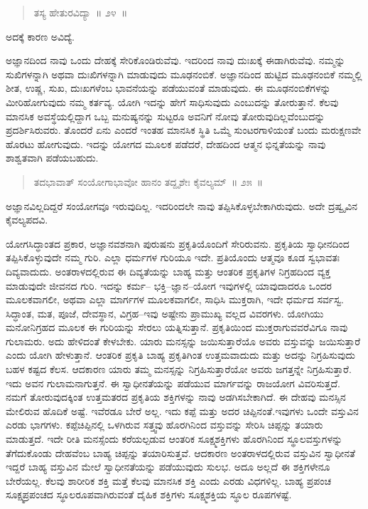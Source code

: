 \vspace{-0.3cm}

\begin{verse}
ತಸ್ಯ ಹೇತುರವಿದ್ಯಾ~॥ ೨೪~॥
\end{verse}

\vspace{-0.3cm}

ಅದಕ್ಕೆ ಕಾರಣ ಅವಿದ್ಯೆ. 

ಅಜ್ಞಾನದಿಂದ ನಾವು ಒಂದು ದೇಹಕ್ಕೆ ಸೇರಿಕೊಂಡಿರುವೆವು. ಇದರಿಂದ ನಾವು ದುಃಖಕ್ಕೆ ಈಡಾಗಿರುವೆವು. ನಮ್ಮನ್ನು ಸುಖಿಗಳನ್ನಾಗಿ ಅಥವಾ ದುಃಖಿಗಳನ್ನಾಗಿ ಮಾಡುವುದು ಮೂಢನಂಬಿಕೆ. ಅಜ್ಞಾನದಿಂದ ಹುಟ್ಟಿದ ಮೂಢನಂಬಿಕೆ ನಮ್ಮಲ್ಲಿ ಶೀತ, ಉಷ್ಣ, ಸುಖ, ದುಃಖಗಳೆಂಬ ಭಾವನೆಯನ್ನು ಪಡೆಯುವಂತೆ ಮಾಡುವುದು. ಈ ಮೂಢನಂಬಿಕೆಗಳನ್ನು ಮೀರಿಹೋಗುವುದು ನಮ್ಮ ಕರ್ತವ್ಯ. ಯೋಗಿ ಇದನ್ನು ಹೇಗೆ ಸಾಧಿಸುವುದು ಎಂಬುದನ್ನು ತೋರುತ್ತಾನೆ. ಕೆಲವು ಮಾನಸಿಕ ಅವಸ್ಥೆಯಲ್ಲಿದ್ದಾಗ ಒಬ್ಬ ಮನುಷ್ಯನನ್ನು ಸುಟ್ಟರೂ ಅವನಿಗೆ ನೋವು ತೋರುವುದಿಲ್ಲವೆಂಬುದನ್ನು ಪ್ರದರ್ಶಿಸಿರುವರು. ತೊಂದರೆ ಏನು ಎಂದರೆ ಇಂತಹ ಮಾನಸಿಕ ಸ್ಥಿತಿ ಒಮ್ಮೆ ಸುಂಟರಗಾಳಿಯಂತೆ ಬಂದು ಮರುಕ್ಷಣವೇ ಹೊರಟು ಹೋಗುವುದು. ಇದನ್ನು ಯೋಗದ ಮೂಲಕ ಪಡೆದರೆ, ದೇಹದಿಂದ ಆತ್ಮನ ಭಿನ್ನತೆಯನ್ನು ನಾವು ಶಾಶ್ವತವಾಗಿ ಪಡೆಯಬಹುದು. 

\vspace{-0.3cm}

\begin{verse}
ತದಭಾವಾತ್​ ಸಂಯೋಗಾಭಾವೋ ಹಾನಂ ತದ್ದೃಶೇಃ ಕೈವಲ್ಯಮ್​~॥ ೨೫~॥
\end{verse}

\vspace{-0.3cm}


ಅಜ್ಞಾನವಿಲ್ಲದಿದ್ದರೆ ಸಂಯೋಗವೂ ಇರುವುದಿಲ್ಲ. ಇದರಿಂದಲೇ ನಾವು ತಪ್ಪಿಸಿಕೊಳ್ಳಬೇಕಾಗಿರುವುದು. ಅದೇ ದ್ರಷ್ವೃವಿನ ಕೈವಲ್ಯಪದವಿ. 

ಯೋಗಸಿದ್ಧಾಂತದ ಪ್ರಕಾರ, ಅಜ್ಞಾನವಶನಾಗಿ ಪುರುಷನು ಪ್ರಕೃತಿಯೊಂದಿಗೆ ಸೇರಿರುವನು. ಪ್ರಕೃತಿಯ ಸ್ವಾಧೀನದಿಂದ ತಪ್ಪಿಸಿಕೊಳ್ಳುವುದೇ ನಮ್ಮ ಗುರಿ. ಎಲ್ಲಾ ಧರ್ಮಗಳ ಗುರಿಯೂ ಇದೇ. ಪ್ರತಿಯೊಂದು ಆತ್ಮವೂ ಕೂಡ ಸ್ವಭಾವತಃ ದಿವ್ಯವಾದುದು. ಅಂತರಾಳದಲ್ಲಿರುವ ಈ ದಿವ್ಯತೆಯನ್ನು ಬಾಹ್ಯ ಮತ್ತು ಆಂತರಿಕ ಪ್ರಕೃತಿಗಳ ನಿಗ್ರಹದಿಂದ ವ್ಯಕ್ತ ಮಾಡುವುದೇ ಜೀವನದ ಗುರಿ. ಇದನ್ನು ಕರ್ಮ– ಭಕ್ತಿ–ಜ್ಞಾನ–ಯೋಗ ಇವುಗಳಲ್ಲಿ ಯಾವುದಾದರೂ ಒಂದರ ಮೂಲಕವಾಗಲೀ, ಅಥವಾ ಎಲ್ಲಾ ಮಾರ್ಗಗಳ ಮೂಲಕವಾಗಲೀ, ಸಾಧಿಸಿ ಮುಕ್ತರಾಗಿ, ಇದೇ ಧರ್ಮದ ಸರ್ವಸ್ವ. ಸಿದ್ಧಾಂತ, ಮತ, ಪೂಜೆ, ದೇವಸ್ಥಾನ, ವಿಗ್ರಹ–ಇವು ಅಷ್ಟೇನು ಪ್ರಾಮುಖ್ಯ ವಲ್ಲದ ವಿವರಗಳು. ಯೋಗಿಯು ಮನೋನಿಗ್ರಹದ ಮೂಲಕ ಈ ಗುರಿಯನ್ನು ಸೇರಲು ಯತ್ನಿಸುತ್ತಾನೆ. ಪ್ರಕೃತಿಯಿಂದ ಮುಕ್ತರಾಗುವವರೆವಿಗೂ ನಾವು ಗುಲಾಮರು. ಅದು ಹೇಳಿದಂತೆ ಕೇಳಬೇಕು. ಯಾರು ಮನಸ್ಸನ್ನು ಜಯಿಸುತ್ತಾರೆಯೊ ಅವರು ವಸ್ತುವನ್ನು ಜಯಿಸುತ್ತಾರೆ ಎಂದು ಯೋಗಿ ಹೇಳುತ್ತಾನೆ. ಆಂತರಿಕ ಪ್ರಕೃತಿ ಬಾಹ್ಯ ಪ್ರಕೃತಿಗಿಂತ ಉತ್ತಮವಾದುದು ಮತ್ತು ಅದನ್ನು ನಿಗ್ರಹಿಸುವುದು ಬಹಳ ಕಷ್ಟದ ಕೆಲಸ. ಆದಕಾರಣ ಯಾರು ತಮ್ಮ ಮನಸ್ಸನ್ನು ನಿಗ್ರಹಿಸುತ್ತಾರೆಯೋ ಅವರು ಜಗತ್ತನ್ನೇ ನಿಗ್ರಹಿಸುತ್ತಾರೆ. ಇದು ಅವನ ಗುಲಾಮನಾಗುತ್ತನೆ. ಈ ಸ್ವಾಧೀನತೆಯನ್ನು ಪಡೆಯುವ ಮಾರ್ಗವನ್ನು ರಾಜಯೋಗ ವಿವರಿಸುತ್ತದೆ. ನಮಗೆ ತೋರುವುದಕ್ಕಿಂತ ಉತ್ತಮತರದ ಪ್ರಕೃತಿಯ ಶಕ್ತಿಗಳನ್ನು ನಾವು ಅಡಗಿಸಬೇಕಾಗಿದೆ. ಈ ದೇಹವು ಮನಸ್ಸಿನ ಮೇಲಿರುವ ಹೊದಿಕೆ ಅಷ್ಟೆ. ಇವೆರಡೂ ಬೇರೆ ಅಲ್ಲ. ಇದು ಕಪ್ಪೆ ಮತ್ತು ಅದರ ಚಿಪ್ಪಿನಂತೆ.\break ಇವುಗಳು ಒಂದೇ ವಸ್ತುವಿನ ಎರಡು ಭಾಗಗಳು. ಕಪ್ಪೆಚಿಪ್ಪಿನಲ್ಲಿ ಒಳಗಿರುವ ಸತ್ತ್ವವು ಹೊರಗಿನಿಂದ ವಸ್ತುವನ್ನು ಸೇರಿಸಿ ಚಿಪ್ಪನ್ನು ತಯಾರು ಮಾಡುತ್ತದೆ. ಇದೇ ರೀತಿ ಮನಸ್ಸೆಂದು ಕರೆಯಲ್ಪಡುವ ಆಂತರಿಕ ಸೂಕ್ಷ್ಮಶಕ್ತಿಗಳು ಹೊರಗಿನಿಂದ ಸ್ಥೂಲವಸ್ತುಗಳನ್ನು ತೆಗೆದುಕೊಂಡು ದೇಹವೆಂಬ ಬಾಹ್ಯ ಚಿಪ್ಪನ್ನು ತಯಾರಿಸುತ್ತವೆ. ಆದಕಾರಣ ಅಂತರಾಳದಲ್ಲಿರುವ ವಸ್ತುವಿನ ಸ್ವಾಧೀನತೆ ಇದ್ದರೆ ಬಾಹ್ಯ ವಸ್ತುವಿನ ಮೇಲೆ ಸ್ವಾಧೀನತೆಯನ್ನು ಪಡೆಯುವುದು ಸುಲಭ. ಅದೂ ಅಲ್ಲದೆ ಈ ಶಕ್ತಿಗಳೇನೂ ಬೇರೆಯಲ್ಲ. ಕೆಲವು ಶಾರೀರಿಕ ಶಕ್ತಿ ಮತ್ತೆ ಕೆಲವು ಮಾನಸಿಕ ಶಕ್ತಿ ಎಂದು ಎರಡು ವಿಧಗಳಿಲ್ಲ. ಬಾಹ್ಯ ಪ್ರಪಂಚ ಸೂಕ್ಷ್ಮಪ್ರಪಂಚದ ಸ್ಥೂಲರೂಪವಾಗಿರುವಂತೆ ದೈಹಿಕ ಶಕ್ತಿಗಳು ಸೂಕ್ಷ್ಮಶಕ್ತಿಯ ಸ್ಥೂಲ ರೂಪಗಳಷ್ಟೆ. 

